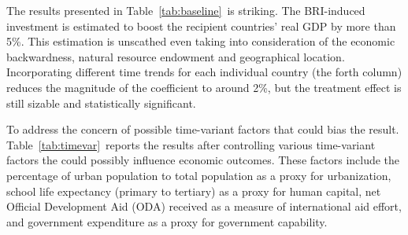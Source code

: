 \documentclass[10pt,a4paper]{article}
\begin{document}
The results presented in Table~{\ref{tab:baseline}}~is
striking. The BRI-induced investment is estimated to boost the recipient
countries' real GDP by more than 5\%. This estimation is unscathed even
taking into consideration of the economic backwardness, natural resource
endowment and geographical location. Incorporating different time trends
for each individual country (the forth column) reduces the magnitude of
the coefficient to around 2\%, but the treatment effect is still sizable
and statistically significant.

To address the concern of possible time-variant factors that could bias
the result. Table~{\ref{tab:timevar}}~reports the
results after controlling various time-variant factors the could
possibly influence economic outcomes. These factors include the
percentage of urban population to total population as a proxy for
urbanization, school life expectancy (primary to tertiary) as a proxy
for human capital, net Official Development Aid (ODA) received as a
measure of international aid effort, and government expenditure as a
proxy for government capability.~
\end{document}

